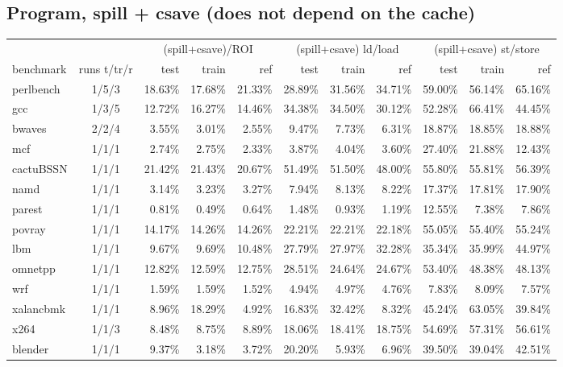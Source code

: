 \documentclass[10pt,a4paper,landscape]{article}
\begin{document}
\subsection*{Program, spill + csave (does not depend on the cache)}
{\footnotesize
\begin{longtable}{lcrrrrrrrrr}
\toprule
& & \multicolumn{3}{c}{(spill+csave)/ROI} & \multicolumn{3}{c}{(spill+csave) ld/load} & \multicolumn{3}{c}{(spill+csave) st/store} \\
\cmidrule(lr){3-5}\cmidrule(lr){6-8}\cmidrule(lr){9-11}
benchmark & runs t/tr/r & test & train & ref & test & train & ref & test & train & ref \\
\midrule
\endhead
\bottomrule
\endfoot
perlbench & 1/5/3 & 18.63\% & 17.68\% & 21.33\% & 28.89\% & 31.56\% & 34.71\% & 59.00\% & 56.14\% & 65.16\% \\
gcc & 1/3/5 & 12.72\% & 16.27\% & 14.46\% & 34.38\% & 34.50\% & 30.12\% & 52.28\% & 66.41\% & 44.45\% \\
bwaves & 2/2/4 & 3.55\% & 3.01\% & 2.55\% & 9.47\% & 7.73\% & 6.31\% & 18.87\% & 18.85\% & 18.88\% \\
mcf & 1/1/1 & 2.74\% & 2.75\% & 2.33\% & 3.87\% & 4.04\% & 3.60\% & 27.40\% & 21.88\% & 12.43\% \\
cactuBSSN & 1/1/1 & 21.42\% & 21.43\% & 20.67\% & 51.49\% & 51.50\% & 48.00\% & 55.80\% & 55.81\% & 56.39\% \\
namd & 1/1/1 & 3.14\% & 3.23\% & 3.27\% & 7.94\% & 8.13\% & 8.22\% & 17.37\% & 17.81\% & 17.90\% \\
parest & 1/1/1 & 0.81\% & 0.49\% & 0.64\% & 1.48\% & 0.93\% & 1.19\% & 12.55\% & 7.38\% & 7.86\% \\
povray & 1/1/1 & 14.17\% & 14.26\% & 14.26\% & 22.21\% & 22.21\% & 22.18\% & 55.05\% & 55.40\% & 55.24\% \\
lbm & 1/1/1 & 9.67\% & 9.69\% & 10.48\% & 27.79\% & 27.97\% & 32.28\% & 35.34\% & 35.99\% & 44.97\% \\
omnetpp & 1/1/1 & 12.82\% & 12.59\% & 12.75\% & 28.51\% & 24.64\% & 24.67\% & 53.40\% & 48.38\% & 48.13\% \\
wrf & 1/1/1 & 1.59\% & 1.59\% & 1.52\% & 4.94\% & 4.97\% & 4.76\% & 7.83\% & 8.09\% & 7.57\% \\
xalancbmk & 1/1/1 & 8.96\% & 18.29\% & 4.92\% & 16.83\% & 32.42\% & 8.32\% & 45.24\% & 63.05\% & 39.84\% \\
x264 & 1/1/3 & 8.48\% & 8.75\% & 8.89\% & 18.06\% & 18.41\% & 18.75\% & 54.69\% & 57.31\% & 56.61\% \\
blender & 1/1/1 & 9.37\% & 3.18\% & 3.72\% & 20.20\% & 5.93\% & 6.96\% & 39.50\% & 39.04\% & 42.51\% \\

\end{longtable}}
\end{document}
